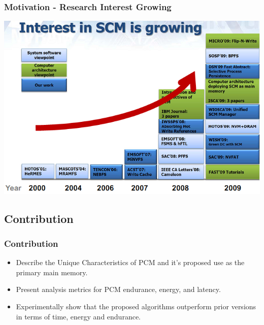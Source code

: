 \begin{frame}
\frametitle{Motivation - Research Interest Growing}

\includegraphics[scale=0.6]{images/growinginterest.png}

\end{frame}




\subsection{Contribution}

\begin{frame}
\frametitle{Contribution}

\begin{itemize}
\item Describe the Unique Characteristics of PCM and it's proposed use as the primary main memory.
\item Present analysis metrics for PCM endurance, energy, and latency.
\item Experimentally show that the proposed algorithms outperform prior versions in terms of time, energy and endurance.
\end{itemize}

\end{frame}